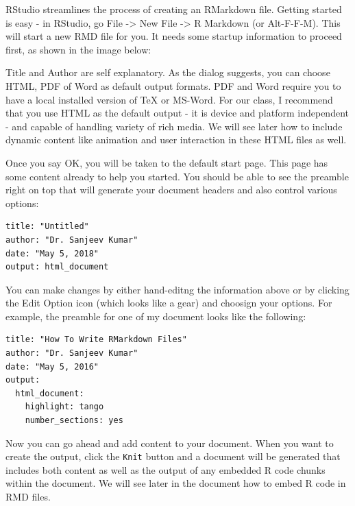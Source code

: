 \documentclass[]{krantz}
\makeatletter
\newenvironment{Shaded}{\begin{snugshade}}{\end{snugshade}}
\newcommand{\CommentTok}[1]{\textcolor[rgb]{0.56,0.35,0.01}{\textit{#1}}}
\newenvironment{kframe}{%
\medskip{}
\setlength{\fboxsep}{.8em}
 \def\at@end@of@kframe{}%
 \ifinner\ifhmode%
  \def\at@end@of@kframe{\end{minipage}}%
  \begin{minipage}{\columnwidth}%
 \fi\fi%
 \def\FrameCommand##1{\hskip\@totalleftmargin \hskip-\fboxsep
 \colorbox{shadecolor}{##1}\hskip-\fboxsep
     \hskip-\linewidth \hskip-\@totalleftmargin \hskip\columnwidth}%
 \MakeFramed {\advance\hsize-\width
   \@totalleftmargin\z@ \linewidth\hsize
   \@setminipage}}%
 {\par\unskip\endMakeFramed%
 \at@end@of@kframe}
\renewenvironment{Shaded}{\begin{kframe}}{\end{kframe}}
\theoremstyle{definition}
\theoremstyle{definition}
\theoremstyle{definition}
\theoremstyle{remark}
\makeatother
\begin{document}
RStudio streamlines the process of creating an RMarkdown file. Getting
started is easy - in RStudio, go File -\textgreater{} New File
-\textgreater{} R Markdown (or Alt-F-F-M). This will start a new RMD
file for you. It needs some startup information to proceed first, as
shown in the image below:

\begin{Shaded}
\begin{Highlighting}[]
\CommentTok{# %
\end{Highlighting}
\end{Shaded}

Title and Author are self explanatory. As the dialog suggests, you can
choose HTML, PDF of Word as default output formats. PDF and Word require
you to have a local installed version of TeX or MS-Word. For our class,
I recommend that you use HTML as the default output - it is device and
platform independent - and capable of handling variety of rich media. We
will see later how to include dynamic content like animation and user
interaction in these HTML files as well.

Once you say OK, you will be taken to the default start page. This page
has some content already to help you started. You should be able to see
the preamble right on top that will generate your document headers and
also control various options:

\begin{verbatim}
title: "Untitled"
author: "Dr. Sanjeev Kumar"
date: "May 5, 2018"
output: html_document
\end{verbatim}

You can make changes by either hand-editng the information above or by
clicking the Edit Option icon (which looks like a gear) and choosign
your options. For example, the preamble for one of my document looks
like the following:

\begin{verbatim}
title: "How To Write RMarkdown Files"
author: "Dr. Sanjeev Kumar"
date: "May 5, 2016"
output:
  html_document: 
    highlight: tango
    number_sections: yes
\end{verbatim}

Now you can go ahead and add content to your document. When you want to
create the output, click the \texttt{Knit} button and a document will be
generated that includes both content as well as the output of any
embedded R code chunks within the document. We will see later in the
document how to embed R code in RMD files.
\end{document}
